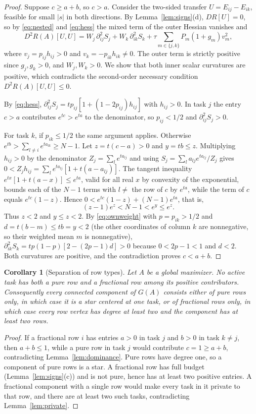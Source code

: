 \documentclass[11pt]{article}
\theoremstyle{plain}
\newtheorem{corollary}[theorem]{Corollary}
\theoremstyle{definition}
\theoremstyle{remark}
\begin{document}
\begin{proof}
Suppose $c\ge a+b$, so $c>a$. Consider the two-sided transfer $U=E_{ij}-E_{ik}$, feasible for small $|s|$ in both directions. By Lemma~\ref{lem:signs}(d), $DR[U]=0$, so by \eqref{eq:nested} and \eqref{eq:hess} the mixed term of the outer Hessian vanishes and
\[
 D^2R(A)[U,U]=W_j\,\partial_{ij}^2S_j+W_k\,\partial_{ik}^2S_k+\tau\sum_{m\in\{j,k\}}P_m(1+g_m)v_m^2,
\]
where $v_j=p_{ij}h_{ij}>0$ and $v_k=-p_{ik}h_{ik}\ne0$. The outer term is strictly positive since $g_j,g_k>0$, and $W_j,W_k>0$. We show that both inner scalar curvatures are positive, which contradicts the second-order necessary condition $D^2R(A)[U,U]\le0$.

By \eqref{eq:hess}, $\partial_{ij}^2S_j=tp_{ij}[1+(1-2p_{ij})h_{ij}]$ with $h_{ij}>0$. In task $j$ the entry $c>a$ contributes $e^{tc}>e^{ta}$ to the denominator, so $p_{ij}<1/2$ and $\partial^2_{ij}S_j>0$.

For task $k$, if $p_{ik}\le1/2$ the same argument applies. Otherwise $e^{tb}>\sum_{l\ne i}e^{ta_{lk}}\ge N-1$. Let $z=t(c-a)>0$ and $y=tb\le z$. Multiplying $h_{ij}>0$ by the denominator $Z_j=\sum_le^{ta_{lj}}$ and using $S_j=\sum_la_{lj}e^{ta_{lj}}/Z_j$ gives $0<Z_jh_{ij}=\sum_le^{ta_{lj}}[1+t(a-a_{lj})]$. The tangent inequality $e^{tx}[1+t(a-x)]\le e^{ta}$, valid for all real $x$ by convexity of the exponential, bounds each of the $N-1$ terms with $l\ne$ the row of $c$ by $e^{ta}$, while the term of $c$ equals $e^{tc}(1-z)$. Hence $0<e^{tc}(1-z)+(N-1)e^{ta}$, that is,
\[
 (z-1)e^z<N-1<e^{y}\le e^{z}.
\]
Thus $z<2$ and $y\le z<2$. By \eqref{eq:ownweight} with $p=p_{ik}>1/2$ and $d=t(b-m)\le tb=y<2$ (the other coordinates of column $k$ are nonnegative, so their weighted mean $m$ is nonnegative), $\partial_{ik}^2S_k=tp(1-p)[2-(2p-1)d]>0$ because $0<2p-1<1$ and $d<2$. Both curvatures are positive, and the contradiction proves $c<a+b$.
\end{proof}

\begin{corollary}[Separation of row types]\label{cor:separation}
Let $A$ be a global maximizer. No active task has both a pure row and a fractional row among its positive contributors. Consequently every connected component of $G(A)$ consists either of pure rows only, in which case it is a star centered at one task, or of fractional rows only, in which case every row vertex has degree at least two and the component has at least two rows.
\end{corollary}

\begin{proof}
If a fractional row $i$ has entries $a>0$ in task $j$ and $b>0$ in task $k\ne j$, then $a+b\le1$, while a pure row in task $j$ would contribute $c=1\ge a+b$, contradicting Lemma~\ref{lem:dominance}. Pure rows have degree one, so a component of pure rows is a star. A fractional row has full budget (Lemma~\ref{lem:signs}(c)) and is not pure, hence has at least two positive entries. A fractional component with a single row would make every task in it private to that row, and there are at least two such tasks, contradicting Lemma~\ref{lem:private}.
\end{proof}
\end{document}
